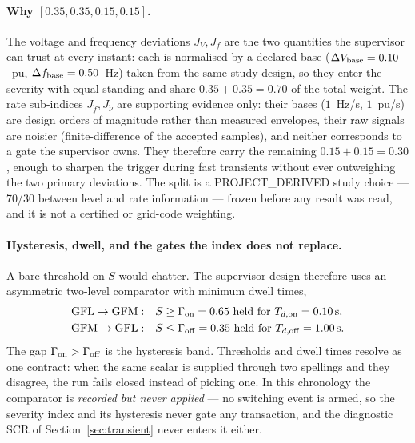 \documentclass[12pt,a4paper]{article}
\newcommand{\second}{\ifmmode\,\mathrm{s}\else\ s\fi}
\begin{document}
\paragraph{Why $[0.35,0.35,0.15,0.15]$.}
The voltage and frequency deviations $J_V,J_f$ are the two quantities the
supervisor can trust at every instant: each is normalised by a declared base
($\Delta V_{\rm base}=0.10$~pu, $\Delta f_{\rm base}=0.50$~Hz) taken from the
same study design, so they enter the severity with equal standing and share
$0.35+0.35=0.70$ of the total weight.  The rate sub-indices $J_{\dot f},
J_{\dot\nu}$ are supporting evidence only: their bases ($1$~Hz/s, $1$~pu/s)
are design orders of magnitude rather than measured envelopes, their raw
signals are noisier (finite-difference of the accepted samples), and neither
corresponds to a gate the supervisor owns.  They therefore carry the remaining
$0.15+0.15=0.30$, enough to sharpen the trigger during fast transients without
ever outweighing the two primary deviations.  The split is a
\textsf{PROJECT\_DERIVED} study choice --- 70/30 between level and rate
information --- frozen before any result was read, and it is not a certified
or grid-code weighting.

\paragraph{Hysteresis, dwell, and the gates the index does not replace.}
A bare threshold on $S$ would chatter.  The supervisor design therefore uses an
asymmetric two-level comparator with minimum dwell times,
\begin{equation}
  \begin{aligned}
    \text{GFL}\to\text{GFM}:&\quad S\ge\Gamma_{\rm on}=0.65
       \ \text{held for}\ T_{d,\rm on}=0.10\second,\\
    \text{GFM}\to\text{GFL}:&\quad S\le\Gamma_{\rm off}=0.35
       \ \text{held for}\ T_{d,\rm off}=1.00\second.
  \end{aligned}
  \label{eq:hyst}
\end{equation}
The gap $\Gamma_{\rm on}>\Gamma_{\rm off}$ is the hysteresis band.  Thresholds
and dwell times resolve as one contract: when the same scalar is supplied
through two spellings and they disagree, the run fails closed instead of picking
one.  In this chronology the comparator is \emph{recorded but never applied} ---
no switching event is armed, so the severity index and its hysteresis never gate
any transaction, and the diagnostic SCR of Section~\ref{sec:transient} never
enters it either.
\end{document}

